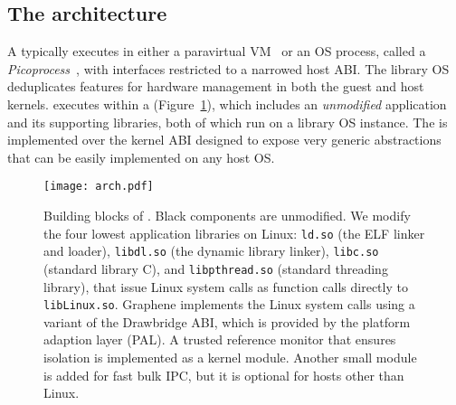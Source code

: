 \subsection{The architecture}
\label{sec:overview:libos:arch}

A \libos{} typically executes in either a paravirtual VM~\cite{unikernels,osv}
or an OS process, called a \emph{Picoprocess}~\cite{porter11drawbridge,baumann13bascule}, with interfaces restricted to a narrowed host ABI.
The library OS deduplicates features for hardware management in both the guest and host kernels.
\graphene{} executes within a \picoproc{} (Figure~\ref{fig:overview:arch}),
which includes an {\em unmodified} application and its supporting libraries, both of which run on a library OS instance.
The \libos{} is implemented over the kernel ABI designed to expose very generic abstractions that can be easily implemented on any host OS.


\begin{figure}[t]
\centering
\texttt{[image: arch.pdf]}
\caption{Building blocks of \graphene{}.  Black components are unmodified.
We modify the four lowest application libraries on Linux:
{\tt ld.so} (the ELF linker and loader),
{\tt libdl.so} (the dynamic library linker),
{\tt libc.so} (standard library C),
and {\tt libpthread.so} (standard threading library), that issue Linux system calls as function calls directly to {\tt libLinux.so}.
Graphene implements the Linux system calls using a variant of the Drawbridge ABI, which is provided by the platform adaption layer (PAL).
A trusted reference monitor that ensures \libos{} isolation is implemented as a kernel module. Another small module is added for fast bulk IPC, but it is optional for hosts other than Linux.}
\label{fig:overview:arch}
\end{figure}


